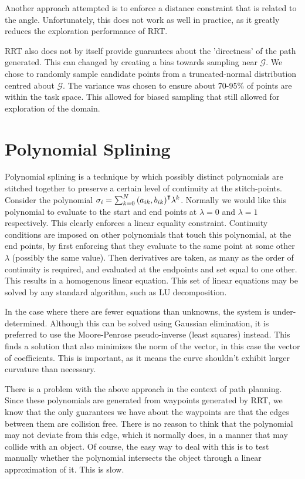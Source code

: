 \documentclass[oneside, 11pt]{book}
\begin{document}
Another approach attempted is to enforce a distance constraint that is related to the angle. Unfortunately, this does not work as well in practice, as it greatly reduces the exploration performance of RRT.

RRT also does not by itself provide guarantees about the 'directness' of the path generated. This can changed by creating a bias towards sampling near $\mathcal{G}$\cite{LaValle06}\cite{Yang14}. We chose to randomly sample candidate points from a truncated-normal distribution centred about $\mathcal{G}$. The variance was chosen to ensure about 70-95\% of points are within the task space. This allowed for biased sampling that still allowed for exploration of the domain.

\section{Polynomial Splining}
Polynomial splining is a technique by which possibly distinct polynomials are stitched together to preserve a certain level of continuity at the stitch-points. Consider the polynomial $\sigma_i = \sum_{k=0}^N{{(a_{ik},b_{ik})}^{\intercal}\lambda^k}$. Normally we would like this polynomial to evaluate to the start and end points at $\lambda=0$ and $\lambda=1$ respectively. This clearly enforces a linear equality constraint. Continuity conditions are imposed on other polynomials that touch this polynomial, at the end points, by first enforcing that they evaluate to the same point at some other $\lambda$ (possibly the same value). Then derivatives are taken, as many as the order of continuity is required, and evaluated at the endpoints and set equal to one other. This results in a homogenous linear equation. This set of linear equations may be solved by any standard algorithm, such as LU decomposition.

In the case where there are fewer equations than unknowns, the system is under-determined. Although this can be solved using Gaussian elimination, it is preferred to use the Moore-Penrose pseudo-inverse (least squares) instead. This finds a solution that also minimizes the norm of the vector, in this case the vector of coefficients. This is important, as it means the curve shouldn't exhibit larger curvature than necessary.

There is a problem with the above approach in the context of path planning. Since these polynomials are generated from waypoints generated by RRT, we know that the only guarantees we have about the waypoints are that the edges between them are collision free. There is no reason to think that the polynomial may not deviate from this edge, which it normally does, in a manner that may collide with an object. Of course, the easy way to deal with this is to test manually whether the polynomial intersects the object through a linear approximation of it. This is slow.
\end{document}
